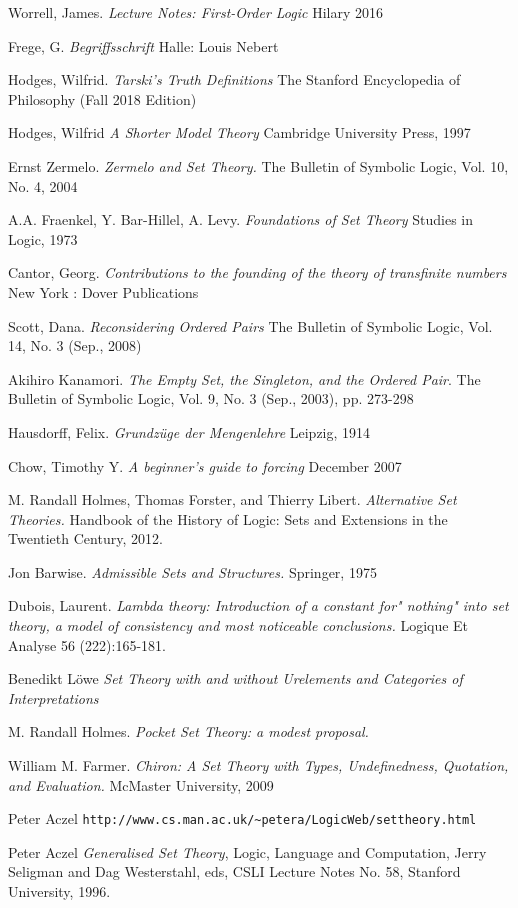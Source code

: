 \documentclass[11pt]{report}
\theoremstyle{definition}
\theoremstyle{theorem}
\theoremstyle{lemma}
\begin{document}
\begin{thebibliography}{9}
Worrell, James.
\textit{Lecture Notes: First-Order Logic}
Hilary 2016

Frege, G.
\textit{Begriffsschrift}
Halle: Louis Nebert

Hodges, Wilfrid.
\textit{Tarski's Truth Definitions}
The Stanford Encyclopedia of Philosophy (Fall 2018 Edition)

Hodges, Wilfrid
\textit{A Shorter Model Theory}
Cambridge University Press, 1997

Ernst Zermelo.
\textit{Zermelo and Set Theory.}
The Bulletin of Symbolic Logic, Vol. 10, No. 4, 2004

A.A. Fraenkel, Y. Bar-Hillel, A. Levy.
\textit{Foundations of Set Theory}
Studies in Logic, 1973

Cantor, Georg.
\textit{Contributions to the founding of the theory of transfinite numbers}
New York : Dover Publications

Scott, Dana. 
\textit{Reconsidering Ordered Pairs}
The Bulletin of Symbolic Logic, Vol. 14, No. 3 (Sep., 2008)

Akihiro Kanamori.
\textit{The Empty Set, the Singleton, and the Ordered Pair}.
The Bulletin of Symbolic Logic, Vol. 9, No. 3 (Sep., 2003), pp. 273-298

Hausdorff, Felix. 
\textit{Grundzüge der Mengenlehre}
Leipzig, 1914

Chow, Timothy Y.
\textit{A beginner's guide to forcing}
December 2007

M. Randall Holmes, Thomas Forster, and Thierry Libert.
\textit{Alternative Set Theories.}
Handbook of the History of Logic: Sets and Extensions in the Twentieth Century, 2012.

Jon Barwise.
\textit{Admissible Sets and Structures.}
Springer, 1975

Dubois, Laurent.
\textit{Lambda theory: Introduction of a constant for" nothing" into set theory, a model of consistency and most noticeable conclusions.} 
Logique Et Analyse 56 (222):165-181.

Benedikt L\"owe
\textit{Set Theory with and without Urelements and Categories of Interpretations}

M. Randall Holmes.
\textit{Pocket Set Theory: a modest proposal.}

William M. Farmer.
\textit{Chiron: A Set Theory with Types,
Undefinedness, Quotation, and Evaluation.}
McMaster University, 2009

Peter Aczel
\verb|http://www.cs.man.ac.uk/~petera/LogicWeb/settheory.html|

Peter Aczel
\textit{Generalised Set Theory}, 
Logic, Language and Computation, Jerry Seligman and Dag Westerstahl, eds, CSLI Lecture Notes No. 58, Stanford University, 1996.

\end{thebibliography}
\end{document}
